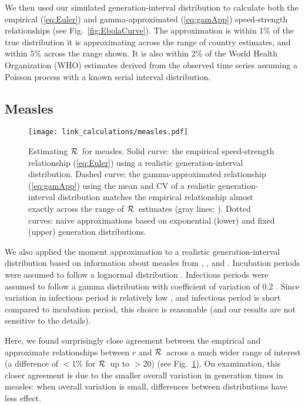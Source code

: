 \documentclass[12pt]{article}
\newcommand{\RR}{\ensuremath{{\cal R}}}
\newcommand{\eref}[1]{(\ref{eq:#1})}
\newcommand{\fref}[1]{Fig.~\ref{fig:#1}}
\begin{document}
We then used our simulated generation-interval distribution to calculate both the empirical \eref{Euler} and gamma-approximated \eref{gamApp} speed-strength relationships (see \fref{EbolaCurve}). The approximation is within 1\% of the true distribution it is approximating across the range of country estimates, and within 5\% across the range shown. It is also within 2\% of the World Health Organization (WHO) estimates derived from the observed time series assuming a Poisson process with a known serial interval distribution. 

\subsection{Measles}
\label{MeaslesEx}

\begin{figure}[htbp] \centering
	\texttt{[image: link\_calculations/measles.pdf]}
	\caption{Estimating \RR~for measles.
		Solid curve: the empirical speed-strength relationship \eref{Euler} using a realistic generation-interval distribution.
		Dashed curve: the gamma-approximated relationship \eref{gamApp} using the mean and CV of a realistic generation-interval distribution matches the empirical relationship almost exactly across the range of \RR\ estimates (gray lines; \cite{anderson1982directly}).
		Dotted curves: naive approximations based on exponential (lower) and fixed (upper) generation distributions.
	}
	\label{fig:measlesCurve}
\end{figure}

We also applied the moment approximation to a realistic generation-interval distribution based on information about measles from \cite{LessReic09}, \cite{Lloy01}, and \cite{anderson1982directly}. 
Incubation periods were assumed to follow a lognormal distribution \cite{LessReic09}. 
Infectious periods were assumed to follow a gamma distribution with coefficient of variation of 0.2 \cite{simpson1952infectiousness,Lloy01,KeelGren97}. Since variation in infectious period is relatively low \cite{simpson1952infectiousness,KeelGren97}, and infectious period is short compared to incubation period, this choice is reasonable (and our results are not sensitive to the details).

Here, we found surprisingly close agreement between the empirical and approximate relationships between $r$ and \RR\ across a much wider range of interest (a difference of $<1\%$ for \RR\ up to $>20$) (see \fref{measlesCurve}).
On examination, this closer agreement is due to the smaller overall variation in generation times in measles: when overall variation is small, differences between distributions have less effect.
\end{document}
